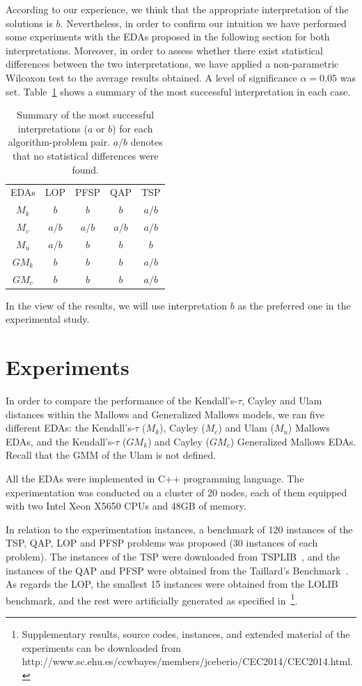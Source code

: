 \documentclass[conference]{IEEEtran}
\begin{document}
According to our experience, we think that the appropriate interpretation of the solutions is $b$. Nevertheless, in order to confirm our intuition we have performed some experiments with the EDAs proposed in the following section for both interpretations. Moreover, in order to assess whether there exist statistical differences between the two interpretations, we have applied a non-parametric Wilcoxon test to the average results obtained. A level of significance $\alpha=0.05$ was set. Table~\ref{interpretations} shows a summary of the most successful interpretation in each case.
\begin{table}
\centering
\caption{Summary of the most successful interpretations ($a$ or $b$) for each algorithm-problem pair. $a/b$ denotes that no statistical differences were found.}
\begin{tabular}{c|cccc}
 EDAs & LOP & PFSP & QAP & TSP\\    \hdashline[1pt/2pt] 
 $M_k$ & $b$ & $b$ & $b$ & $a/b$ \\
 $M_c$ & $a/b$ & $a/b$ & $a/b$ & $a/b$ \\ 
 $M_u$ & $a/b$  & $b$ & $b$ & $b$ \\ 
 $GM_k$ & $b$ & $b$ & $b$ & $a/b$ \\ 
 $GM_c$ & $b$ & $b$ & $b$ & $a/b$ \\
\end{tabular}
\label{interpretations}
\end{table}
In the view  of the results, we will use interpretation $b$ as the preferred one in the experimental study.

\section{Experiments}\label{sec:experiments}
In order to compare the performance of the Kendall's-$\tau$, Cayley and Ulam distances within the Mallows and Generalized Mallows models, we ran five different EDAs: the Kendall's-$\tau$ ($M_k$), Cayley ($M_c$) and Ulam ($M_u$) Mallows EDAs, and the Kendall's-$\tau$ ($GM_k$) and Cayley ($GM_c$)  Generalized Mallows EDAs. Recall that the GMM of the Ulam is not defined.

All the EDAs were implemented in C++ programming language. The experimentation was conducted on a cluster of 20 nodes, each of them equipped with two Intel Xeon X5650 CPUs and 48GB of memory.

In relation to the experimentation instances, a benchmark of 120 instances of the TSP, QAP, LOP and PFSP problems was proposed (30 instances of each problem). The instances of the TSP were downloaded from TSPLIB~\cite{tsplib}, and the instances of the QAP and PFSP were obtained from the Taillard's Benchmark~\cite{erictaillard}. As regards the LOP, the smallest 15 instances were obtained from the LOLIB benchmark, and the rest were artificially generated as specified in~\cite{ceberio14a}\footnote{Supplementary results, source codes, instances, and extended material of the experiments can be downloaded from http://www.sc.ehu.es/ccwbayes/members/jceberio/CEC2014/CEC2014.html.}.
\end{document}
